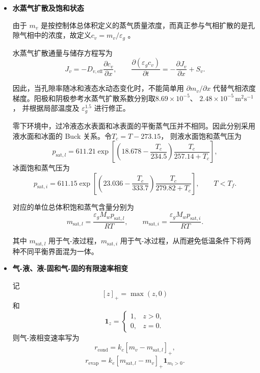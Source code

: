 \documentclass[bwprint]{gmcmthesis}
\numberwithin{figure}{section}
\begin{document}
\begin{itemize}
 其他区域取 \(S_w = 0\)。其中
\[
M_w = 0.018 \, \text{kg mol}^{-1}, \qquad F = 96485 \, \text{C mol}^{-1}.
\]

 本题将电化学生成水首先计入阴极 CL 的液态水，再由有限速率相变模型重新进行相态分配。

\item \textbf {水蒸气扩散及饱和状态}


 由于 \(m_v\) 是按控制体总体积定义的蒸气质量浓度，而真正参与气相扩散的是孔隙气相中的浓度，故定义$c_v = m_v/\varepsilon_g$ 。

 水蒸气扩散通量与储存方程写为
\begin{equation}
J_v = -D_{v,\text{eff}} \frac{\partial c_v}{\partial x}, \qquad \frac{\partial(\varepsilon_g c_v)}{\partial t} = -\frac{\partial J_v}{\partial x} + S_v. \tag{4-24}
\end{equation}

 因此，当孔隙率随冰和液态水动态变化时，不能简单用 \(\partial m_v/\partial x\) 代替气相浓度梯度。阳极和阴极参考水蒸气扩散系数分别取$8.69 \times 10^{-5}$、 $2.48 \times 10^{-5} \, \text{m}^2\text{s}^{-1}$，
并根据局部温度及 \(\varepsilon_g^{1.5}\) 进行修正。

 零下环境中，过冷液态水表面和冰表面的平衡蒸气压并不相同。因此分别采用液水面和冰面的 Buck 关系。令$T_c = T - 273.15$，
则液水面饱和蒸气压为
\begin{equation}
p_{\text{sat},l} = 611.21 \exp\left[ \left(18.678 - \frac{T_c}{234.5}\right) \frac{T_c}{257.14 + T_c} \right],
\tag{4-25}
\end{equation}
冰面饱和蒸气压为
\begin{equation}
p_{\text{sat},i} = 611.15 \exp\left[ \left(23.036 - \frac{T_c}{333.7}\right) \frac{T_c}{279.82 + T_c} \right], \qquad T < T_f. \tag{4-26}
\end{equation}

 对应的单位总体积饱和蒸气含量分别为
\begin{equation}
m_{\text{sat},l} = \frac{\varepsilon_g M_w p_{\text{sat},l}}{RT}, \qquad m_{\text{sat},i} = \frac{\varepsilon_g M_w p_{\text{sat},i}}{RT}. \tag{4-27}
\end{equation}

 其中 \(m_{\text{sat},l}\) 用于气-液过程，\(m_{\text{sat},i}\) 用于气-冰过程，从而避免低温条件下将两种不同平衡界面混为一体。




\item \textbf {气-液、液-固和气-固的有限速率相变}

 记
\[
[z]_+ = \max(z, 0)
\]
和
\[
\mathbf{1}_{z} = 
\begin{cases} 
1, & z > 0, \\ 
0, & z = 0.
\end{cases}
\]
 则气-液相变速率写为
\begin{equation}
r_{\text{cond}} = k_c [m_v - m_{\text{sat},l}]_+, \tag{4-28}
\end{equation}
\begin{equation}
r_{\text{evap}} = k_e [m_{\text{sat},l} - m_v]_+ \mathbf{1}_{m_l > 0}. \tag{4-29}
\end{equation}


\end{itemize}
\end{document}
